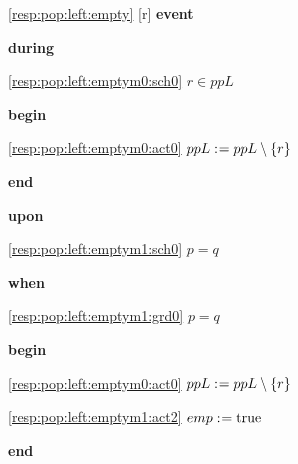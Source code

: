 \noindent \ref{resp:pop:left:empty} [r] \textbf{event}
\begin{block}
  \item   \textbf{during}
  \begin{block}
  \item[ \eqref{resp:pop:left:emptym0:sch0} ]{$r \in ppL $} %
  \end{block}
  \item   \textbf{begin}
  \begin{block}
  \item[ \eqref{resp:pop:left:emptym0:act0} ]{$ppL \mathrel{:\mkern1mu=} ppL \setminus \{ r \} $} %
  \end{block}
  \item   \textbf{end} \\
\end{block}
  \item   \textbf{upon}
\begin{block}
  \begin{block}
  \item[ \eqref{resp:pop:left:emptym1:sch0} ]{$p = q $} %
  \end{block}
  \item   \textbf{when}
  \begin{block}
  \item[ \eqref{resp:pop:left:emptym1:grd0} ]{$p = q $} %
  \end{block}
  \item   \textbf{begin}
  \begin{block}
  \item[ \eqref{resp:pop:left:emptym0:act0} ]{$ppL \mathrel{:\mkern1mu=} ppL \setminus \{ r \} $} %
  \item[ \eqref{resp:pop:left:emptym1:act2} ]{$emp \mathrel{:\mkern1mu=} \text{true} $} %
  \end{block}
  \item   \textbf{end} \\
\end{block}
